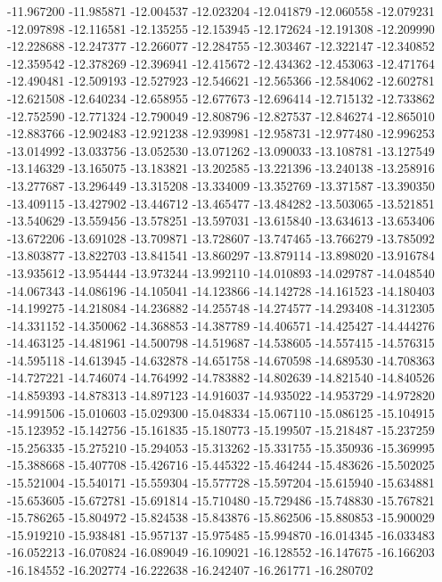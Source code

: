 -11.967200
-11.985871
-12.004537
-12.023204
-12.041879
-12.060558
-12.079231
-12.097898
-12.116581
-12.135255
-12.153945
-12.172624
-12.191308
-12.209990
-12.228688
-12.247377
-12.266077
-12.284755
-12.303467
-12.322147
-12.340852
-12.359542
-12.378269
-12.396941
-12.415672
-12.434362
-12.453063
-12.471764
-12.490481
-12.509193
-12.527923
-12.546621
-12.565366
-12.584062
-12.602781
-12.621508
-12.640234
-12.658955
-12.677673
-12.696414
-12.715132
-12.733862
-12.752590
-12.771324
-12.790049
-12.808796
-12.827537
-12.846274
-12.865010
-12.883766
-12.902483
-12.921238
-12.939981
-12.958731
-12.977480
-12.996253
-13.014992
-13.033756
-13.052530
-13.071262
-13.090033
-13.108781
-13.127549
-13.146329
-13.165075
-13.183821
-13.202585
-13.221396
-13.240138
-13.258916
-13.277687
-13.296449
-13.315208
-13.334009
-13.352769
-13.371587
-13.390350
-13.409115
-13.427902
-13.446712
-13.465477
-13.484282
-13.503065
-13.521851
-13.540629
-13.559456
-13.578251
-13.597031
-13.615840
-13.634613
-13.653406
-13.672206
-13.691028
-13.709871
-13.728607
-13.747465
-13.766279
-13.785092
-13.803877
-13.822703
-13.841541
-13.860297
-13.879114
-13.898020
-13.916784
-13.935612
-13.954444
-13.973244
-13.992110
-14.010893
-14.029787
-14.048540
-14.067343
-14.086196
-14.105041
-14.123866
-14.142728
-14.161523
-14.180403
-14.199275
-14.218084
-14.236882
-14.255748
-14.274577
-14.293408
-14.312305
-14.331152
-14.350062
-14.368853
-14.387789
-14.406571
-14.425427
-14.444276
-14.463125
-14.481961
-14.500798
-14.519687
-14.538605
-14.557415
-14.576315
-14.595118
-14.613945
-14.632878
-14.651758
-14.670598
-14.689530
-14.708363
-14.727221
-14.746074
-14.764992
-14.783882
-14.802639
-14.821540
-14.840526
-14.859393
-14.878313
-14.897123
-14.916037
-14.935022
-14.953729
-14.972820
-14.991506
-15.010603
-15.029300
-15.048334
-15.067110
-15.086125
-15.104915
-15.123952
-15.142756
-15.161835
-15.180773
-15.199507
-15.218487
-15.237259
-15.256335
-15.275210
-15.294053
-15.313262
-15.331755
-15.350936
-15.369995
-15.388668
-15.407708
-15.426716
-15.445322
-15.464244
-15.483626
-15.502025
-15.521004
-15.540171
-15.559304
-15.577728
-15.597204
-15.615940
-15.634881
-15.653605
-15.672781
-15.691814
-15.710480
-15.729486
-15.748830
-15.767821
-15.786265
-15.804972
-15.824538
-15.843876
-15.862506
-15.880853
-15.900029
-15.919210
-15.938481
-15.957137
-15.975485
-15.994870
-16.014345
-16.033483
-16.052213
-16.070824
-16.089049
-16.109021
-16.128552
-16.147675
-16.166203
-16.184552
-16.202774
-16.222638
-16.242407
-16.261771
-16.280702
